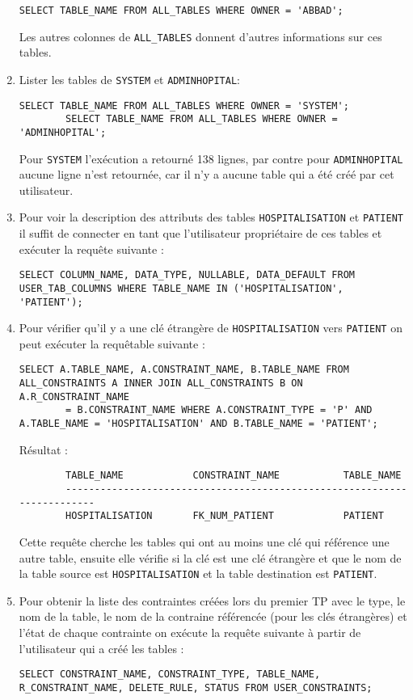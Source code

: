 \documentclass[12pt,a4paper]{article}
\begin{document}
\begin{enumerate}
	\begin{lstlisting}[style=OracleSQL]
		SELECT TABLE_NAME FROM ALL_TABLES WHERE OWNER = 'ABBAD';
	\end{lstlisting}
	Les autres colonnes de \texttt{ALL\_TABLES} donnent d'autres informations sur ces tables.
	\item Lister les tables de \texttt{SYSTEM} et \texttt{ADMINHOPITAL}:
	\begin{lstlisting}[style=OracleSQL]
		SELECT TABLE_NAME FROM ALL_TABLES WHERE OWNER = 'SYSTEM';
		SELECT TABLE_NAME FROM ALL_TABLES WHERE OWNER = 'ADMINHOPITAL';
	\end{lstlisting}
	Pour \texttt{SYSTEM} l'exécution a retourné 138 lignes, par contre pour \texttt{ADMINHOPITAL} aucune ligne n'est retournée, car
	il n'y a aucune table qui a été créé par cet utilisateur.
	\item Pour voir la description des attributs des tables \texttt{HOSPITALISATION} et \texttt{PATIENT} il suffit de connecter en tant
	que l'utilisateur propriétaire de ces tables et exécuter la requête suivante :
	\begin{lstlisting}[style=OracleSQL]
		SELECT COLUMN_NAME, DATA_TYPE, NULLABLE, DATA_DEFAULT FROM USER_TAB_COLUMNS WHERE TABLE_NAME IN ('HOSPITALISATION', 'PATIENT');
	\end{lstlisting}
	\item Pour vérifier qu'il y a une clé étrangère de \texttt{HOSPITALISATION} vers \texttt{PATIENT} on peut exécuter la requêtable
	suivante :
	\begin{lstlisting}[style=OracleSQL]
		SELECT A.TABLE_NAME, A.CONSTRAINT_NAME, B.TABLE_NAME FROM ALL_CONSTRAINTS A INNER JOIN ALL_CONSTRAINTS B ON A.R_CONSTRAINT_NAME
		= B.CONSTRAINT_NAME WHERE A.CONSTRAINT_TYPE = 'P' AND A.TABLE_NAME = 'HOSPITALISATION' AND B.TABLE_NAME = 'PATIENT';
	\end{lstlisting}
	Résultat :
	\begin{verbatim}
		TABLE_NAME            CONSTRAINT_NAME           TABLE_NAME
		------------------------------------------------------------------------
		HOSPITALISATION       FK_NUM_PATIENT            PATIENT
	\end{verbatim}
	Cette requête cherche les tables qui ont au moins une clé qui référence une autre table, ensuite elle vérifie si la clé est une
	clé étrangère et que le nom de la table source est \texttt{HOSPITALISATION} et la table destination est \texttt{PATIENT}.
	\item Pour obtenir la liste des contraintes créées lors du premier TP avec le type, le nom de la table, le nom de la contraine
	référencée (pour les clés étrangères) et l'état de chaque contrainte on exécute la requête suivante à partir de l'utilisateur
	qui a créé les tables :
	\begin{lstlisting}[style=OracleSQL]
		SELECT CONSTRAINT_NAME, CONSTRAINT_TYPE, TABLE_NAME, R_CONSTRAINT_NAME, DELETE_RULE, STATUS FROM USER_CONSTRAINTS;
	\end{lstlisting}
\end{enumerate}
\end{document}

